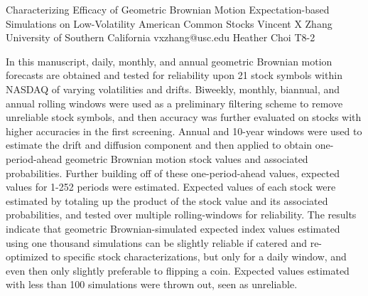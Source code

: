 \begin{talk}
  {Characterizing Efficacy of Geometric Brownian Motion Expectation-based Simulations on Low-Volatility American Common Stocks}%
  {Vincent X Zhang}%
  {University of Southern California}%
  {vxzhang@usc.edu}%
  {Heather Choi}%
  {T8-2}%
			
In this manuscript, daily, monthly, and annual geometric Brownian motion forecasts are obtained and tested for reliability upon 21 stock symbols within NASDAQ of varying volatilities and drifts. Biweekly, monthly, biannual, and annual rolling windows were used as a preliminary filtering scheme to remove unreliable stock symbols, and then accuracy was further evaluated on stocks with higher accuracies in the first screening. Annual and 10-year windows were used to estimate the drift and diffusion component and then applied to obtain one-period-ahead geometric Brownian motion stock values and associated probabilities. Further building off of these one-period-ahead values, expected values for 1-252 periods were estimated. Expected values of each stock were estimated by totaling up the product of the stock value and its associated probabilities, and tested over multiple rolling-windows for reliability. The results indicate that geometric Brownian-simulated expected index values estimated using one thousand simulations can be slightly reliable if catered and re-optimized to specific stock characterizations, but only for a daily window, and even then only slightly preferable to flipping a coin. Expected values estimated with less than 100 simulations were thrown out, seen as unreliable.


\medskip


\end{talk}
